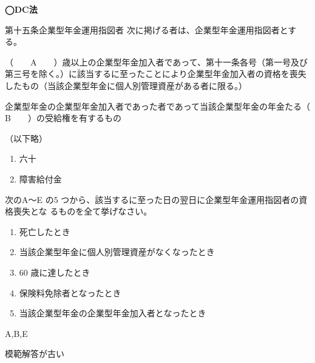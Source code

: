 \begin{fillblank}[年金1 2020 問題1(2)A〜C 改題]
  \noindent \textbf{◯DC法}
  \begin{lawstructure}
    \begin{lawarticle}{第十五条}{企業型年金運用指図者}
      次に掲げる者は、企業型年金運用指図者とする。

      （　　A　　）歳以上の企業型年金加入者であって、第十一条各号（第一号及び第三号を除く。）に該当するに至ったことにより企業型年金加入者の資格を喪失したもの（当該企業型年金に個人別管理資産がある者に限る。）

      企業型年金の企業型年金加入者であった者であって当該企業型年金の年金たる（　　B　　）の受給権を有するもの

      （以下略）
    \end{lawarticle}
  \end{lawstructure}  
\end{fillblank}

\begin{answerbox}
  \begin{enumerate}[A:]
    \item 六十
    \item 障害給付金
  \end{enumerate}
\end{answerbox}

\begin{truefalse}[年金1 2019 問題1(3)\textcircled{4}]
  次のA～E の5 つから、該当するに至った日の翌日に企業型年金運用指図者の資格喪失とな
るものを全て挙げなさい。
\begin{enumerate}[A:]
  \item 死亡したとき
  \item 当該企業型年金に個人別管理資産がなくなったとき
  \item 60 歳に達したとき
  \item 保険料免除者となったとき
  \item 当該企業型年金の企業型年金加入者となったとき
\end{enumerate}
\end{truefalse}

\begin{answerbox}
  A,B,E
\end{answerbox}

\begin{explanationbox}
  模範解答が古い
\end{explanationbox}

\newpage

